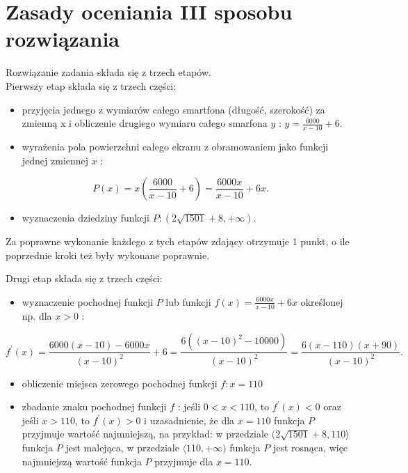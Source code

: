 \documentclass[10pt]{article}
\begin{document}
\section*{Zasady oceniania III sposobu rozwiązania}
Rozwiązanie zadania składa się z trzech etapów.\\
Pierwszy etap składa się z trzech części:

\begin{itemize}
  \item przyjęcia jednego z wymiarów całego smartfona (długość, szerokość) za zmienną x i obliczenie drugiego wymiaru całego smarfona $y$ : $y=\frac{6000}{x-10}+6$.
  \item wyrażenia pola powierzchni całego ekranu z obramowaniem jako funkcji jednej zmiennej $x$ :
\end{itemize}

$$
P(x)=x\left(\frac{6000}{x-10}+6\right)=\frac{6000 x}{x-10}+6 x .
$$

\begin{itemize}
  \item wyznaczenia dziedziny funkcji $P:(2 \sqrt{1501}+8,+\infty)$.
\end{itemize}

Za poprawne wykonanie każdego z tych etapów zdający otrzymuje 1 punkt, o ile poprzednie kroki też były wykonane poprawnie.

Drugi etap składa się z trzech części:

\begin{itemize}
  \item wyznaczenie pochodnej funkcji $P$ lub funkcji $f(x)=\frac{6000 x}{x-10}+6 x$ określonej np. dla $x>0$ :
\end{itemize}

$$
f^{\prime}(x)=\frac{6000(x-10)-6000 x}{(x-10)^{2}}+6=\frac{6\left((x-10)^{2}-10000\right)}{(x-10)^{2}}=\frac{6(x-110)(x+90)}{(x-10)^{2}} .
$$

\begin{itemize}
  \item obliczenie miejsca zerowego pochodnej funkcji $f: x=110$
  \item zbadanie znaku pochodnej funkcji $f$ : jeśli $0<x<110$, to $f^{\prime}(x)<0$ oraz jeśli $x>110$, to $f^{\prime}(x)>0$ i uzasadnienie, że dla $x=110$ funkcja $P$ przyjmuje wartość najmniejszą, na przykład: w przedziale $(2 \sqrt{1501}+8,110\rangle$ funkcja $P$ jest malejąca, w przedziale $\langle 110,+\infty)$ funkcja $P$ jest rosnąca, więc najmniejszą wartość funkcja $P$ przyjmuje dla $x=110$.
\end{itemize}
\end{document}
